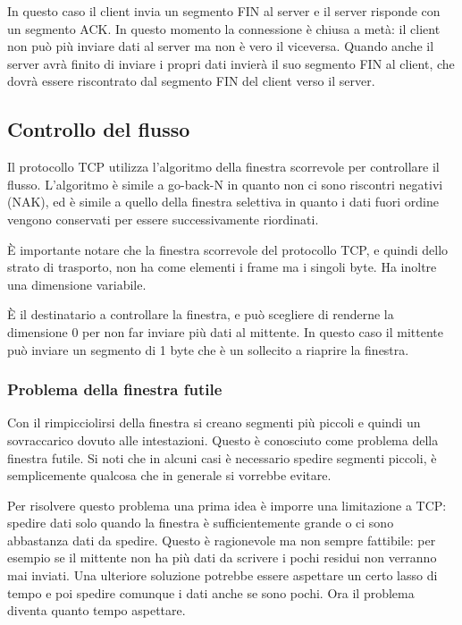             In questo caso il client invia un segmento FIN al server e il server risponde con un segmento ACK. In questo momento la connessione è chiusa a metà: il client non può più inviare dati al server ma non è vero il viceversa. Quando anche il server avrà finito di inviare i propri dati invierà il suo segmento FIN al client, che dovrà essere riscontrato dal segmento FIN del client verso il server.
            
    \subsection{Controllo del flusso}
        Il protocollo TCP utilizza l'algoritmo della finestra scorrevole per controllare il flusso. L'algoritmo è simile a go-back-N in quanto non ci sono riscontri negativi (NAK), ed è simile a quello della finestra selettiva in quanto i dati fuori ordine vengono conservati per essere successivamente riordinati.
        
        È importante notare che la finestra scorrevole del protocollo TCP, e quindi dello strato di trasporto, non ha come elementi i frame ma i singoli byte. Ha inoltre una dimensione variabile.
        
        È il destinatario a controllare la finestra, e può scegliere di renderne la dimensione 0 per non far inviare più dati al mittente. In questo caso il mittente può inviare un segmento di 1 byte che è un sollecito a riaprire la finestra.
        
        \subsubsection{Problema della finestra futile}
            Con il rimpicciolirsi della finestra si creano segmenti più piccoli e quindi un sovraccarico dovuto alle intestazioni. Questo è conosciuto come problema della finestra futile. Si noti che in alcuni casi è necessario spedire segmenti piccoli, è semplicemente qualcosa che in generale si vorrebbe evitare.
            
            Per risolvere questo problema una prima idea è imporre una limitazione a TCP: spedire dati solo quando la finestra è sufficientemente grande o ci sono abbastanza dati da spedire. Questo è ragionevole ma non sempre fattibile: per esempio se il mittente non ha più dati da scrivere i pochi residui non verranno mai inviati. Una ulteriore soluzione potrebbe essere aspettare un certo lasso di tempo e poi spedire comunque i dati anche se sono pochi. Ora il problema diventa quanto tempo aspettare.
            
